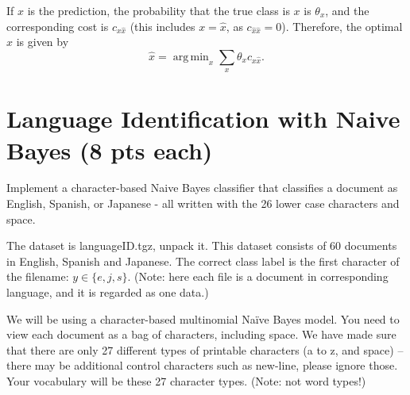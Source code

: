 \documentclass[a4paper]{article}
\theoremstyle{definition}
\DeclareMathOperator*{\argmin}{arg\,min}
\newenvironment{soln}{
    \leavevmode\color{blue}\ignorespaces
}{}
\begin{document}
\begin{soln}
    If $\hat x$ is the prediction, the probability that the true class is $x$ is $\theta_x$, and the corresponding cost is $c_{x\hat{x}}$ (this includes $x=\hat{x}$, as $c_{\hat{x}\hat{x}}=0$). Therefore, the optimal $\hat x$ is given by 
\[\hat{x} = \argmin_{x} \sum_{x} \theta_x c_{x\hat{x}}. \]
\end{soln}

\section{Language Identification with Naive Bayes (8 pts each)}
Implement a character-based Naive Bayes classifier that classifies a document as English, Spanish, or Japanese - all written with the 26 lower case characters and space.

The dataset is languageID.tgz, unpack it.
This dataset consists of 60 documents in English, Spanish and Japanese. 
The correct class label is the first character of the filename: $y \in \{e, j, s\}$. (Note: here each file is a document in corresponding language, and it is regarded as one data.)

We will be using a character-based multinomial Naïve Bayes model.  You need to view each document as a bag of characters, including space.  We have made sure that there are only 27 different types of printable characters (a to z, and space) -- there may be additional control characters such as new-line, please ignore those.  Your vocabulary will be these 27 character types. (Note: not word types!)
\end{document}
